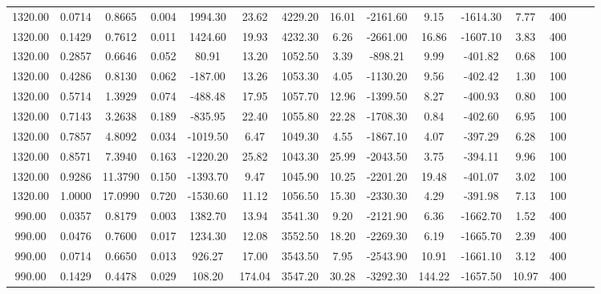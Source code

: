 \documentclass[%
 aip,
 jcp,
 sd,%
 amsmath,amssymb,
]{revtex4-1}
\begin{document}
\begin{table*}[!htbp]
\begin{ruledtabular}
\begin{tabular}{ccccccccccccccc}
1320.00	&	0.0714	&	0.8665	&	0.004	&	1994.30	&	23.62	&	4229.20	&	16.01	&	-2161.60	&	9.15	&	-1614.30	&	7.77	&	400	\\
1320.00	&	0.1429	&	0.7612	&	0.011	&	1424.60	&	19.93	&	4232.30	&	6.26	&	-2661.00	&	16.86	&	-1607.10	&	3.83	&	400	\\
1320.00	&	0.2857	&	0.6646	&	0.052	&	80.91	&	13.20	&	1052.50	&	3.39	&	-898.21	&	9.99	&	-401.82	&	0.68	&	100	\\
1320.00	&	0.4286	&	0.8130	&	0.062	&	-187.00	&	13.26	&	1053.30	&	4.05	&	-1130.20	&	9.56	&	-402.42	&	1.30	&	100	\\
1320.00	&	0.5714	&	1.3929	&	0.074	&	-488.48	&	17.95	&	1057.70	&	12.96	&	-1399.50	&	8.27	&	-400.93	&	0.80	&	100	\\
1320.00	&	0.7143	&	3.2638	&	0.189	&	-835.95	&	22.40	&	1055.80	&	22.28	&	-1708.30	&	0.84	&	-402.60	&	6.95	&	100	\\
1320.00	&	0.7857	&	4.8092	&	0.034	&	-1019.50	&	6.47	&	1049.30	&	4.55	&	-1867.10	&	4.07	&	-397.29	&	6.28	&	100	\\
1320.00	&	0.8571	&	7.3940	&	0.163	&	-1220.20	&	25.82	&	1043.30	&	25.99	&	-2043.50	&	3.75	&	-394.11	&	9.96	&	100	\\
1320.00	&	0.9286	&	11.3790	&	0.150	&	-1393.70	&	9.47	&	1045.90	&	10.25	&	-2201.20	&	19.48	&	-401.07	&	3.02	&	100	\\
1320.00	&	1.0000	&	17.0990	&	0.720	&	-1530.60	&	11.12	&	1056.50	&	15.30	&	-2330.30	&	4.29	&	-391.98	&	7.13	&	100	\\
990.00	&	0.0357	&	0.8179	&	0.003	&	1382.70	&	13.94	&	3541.30	&	9.20	&	-2121.90	&	6.36	&	-1662.70	&	1.52	&	400	\\
990.00	&	0.0476	&	0.7600	&	0.017	&	1234.30	&	12.08	&	3552.50	&	18.20	&	-2269.30	&	6.19	&	-1665.70	&	2.39	&	400	\\
990.00	&	0.0714	&	0.6650	&	0.013	&	926.27	&	17.00	&	3543.50	&	7.95	&	-2543.90	&	10.91	&	-1661.10	&	3.12	&	400	\\
990.00	&	0.1429	&	0.4478	&	0.029	&	108.20	&	174.04	&	3547.20	&	30.28	&	-3292.30	&	144.22	&	-1657.50	&	10.97	&	400	\\
\end{tabular}
\end{ruledtabular}
\end{table*}


\clearpage
\end{document}
